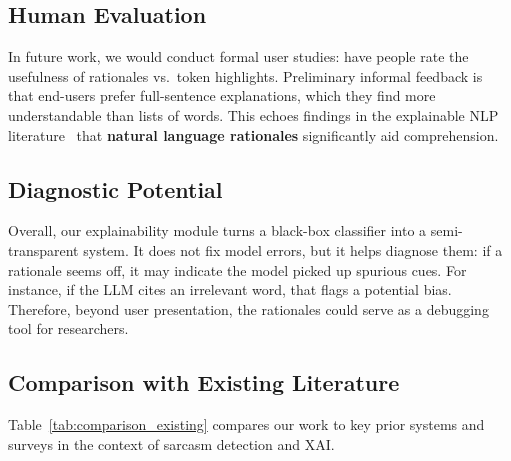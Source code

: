 \subsection{Human Evaluation}\label{subsec:disc_human_eval}

In future work, we would conduct formal user studies: have people rate the usefulness of rationales vs.\ token highlights. Preliminary informal feedback is that end-users prefer full-sentence explanations, which they find more understandable than lists of words. This echoes findings in the explainable NLP literature~\cite{bilal2025llms} that \textbf{natural language rationales} significantly aid comprehension.

\subsection{Diagnostic Potential}\label{subsec:disc_diagnostic}

Overall, our explainability module turns a black-box classifier into a semi-transparent system. It does not fix model errors, but it helps diagnose them: if a rationale seems off, it may indicate the model picked up spurious cues. For instance, if the LLM cites an irrelevant word, that flags a potential bias. Therefore, beyond user presentation, the rationales could serve as a debugging tool for researchers.

\subsection{Comparison with Existing Literature}\label{subsec:disc_comparison}

Table~\ref{tab:comparison_existing} compares our work to key prior systems and surveys in the context of sarcasm detection and XAI\@.

